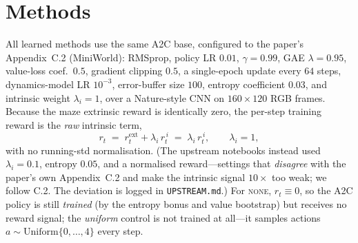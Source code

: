 \documentclass[11pt]{article}
\begin{document}
\section{Methods}
All learned methods use the same A2C base, configured to the paper's Appendix~C.2 (MiniWorld):
RMSprop, policy LR $0.01$, $\gamma=0.99$, GAE $\lambda=0.95$, value-loss coef.\ $0.5$, gradient
clipping $0.5$, a single-epoch update every $64$ steps, dynamics-model LR $10^{-3}$, error-buffer
size $100$, entropy coefficient $0.03$, and intrinsic weight $\lambda_i=1$, over a Nature-style CNN
on $160\times120$ RGB frames. Because the maze extrinsic reward is identically zero, the per-step
training reward is the \emph{raw} intrinsic term,
\begin{equation}
  r_t \;=\; r^{\text{ext}}_t + \lambda_i\, r^{\,i}_t \;=\; \lambda_i\, r^{\,i}_t,
  \qquad \lambda_i = 1,
  \label{eq:reward}
\end{equation}
with no running-std normalisation. (The upstream notebooks instead used $\lambda_i=0.1$, entropy
$0.05$, and a normalised reward---settings that \emph{disagree} with the paper's own Appendix~C.2
and make the intrinsic signal $10\times$ too weak; we follow C.2. The deviation is logged in
\texttt{UPSTREAM.md}.) For \textsc{none}, $r_t\equiv 0$, so the A2C policy is still \emph{trained}
(by the entropy bonus and value bootstrap) but receives no reward signal; the \emph{uniform} control
is not trained at all---it samples actions $a\sim\mathrm{Uniform}\{0,\dots,4\}$ every step.
\end{document}
